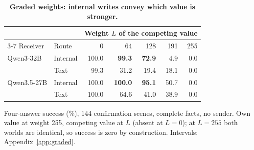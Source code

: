 \begin{table}[t]
\caption{\textbf{Graded weights: internal writes convey which value is stronger.}}
\label{tab:graded_main}
\centering\small
\setlength{\tabcolsep}{3pt}\renewcommand{\arraystretch}{1.1}
\begin{tabular*}{\linewidth}{@{\extracolsep{\fill}}llrrrrr@{}}
\toprule
 & & \multicolumn{5}{c}{Weight $L$ of the competing value} \\\cmidrule(lr){3-7}
Receiver & Route & 0 & 64 & 128 & 191 & 255 \\
\midrule
Qwen3-32B & Internal & 100.0 & \textbf{99.3} & \textbf{72.9} & 4.9 & 0.0 \\
 & Text & 99.3 & 31.2 & 19.4 & 18.1 & 0.0 \\
\addlinespace[2pt]
Qwen3.5-27B & Internal & 100.0 & \textbf{100.0} & \textbf{95.1} & 50.7 & 0.0 \\
 & Text & 100.0 & 64.6 & 41.0 & 38.9 & 0.0 \\
\bottomrule
\end{tabular*}
\par\vspace{3pt}
{\footnotesize\raggedright Four-answer success (\%), 144 confirmation scenes, complete facts, no sender. Own value at weight 255, competing value at $L$ (absent at $L=0$); at $L=255$ both worlds are identical, so success is zero by construction. Intervals: Appendix~\ref{app:graded}.\par}
\end{table}
